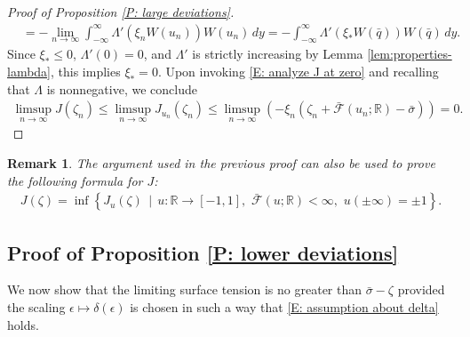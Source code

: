 \documentclass[10pt,a4paper]{amsart}
\newtheorem{remark}{Remark}
\begin{document}
\begin{proof}[Proof of Proposition \ref{P: large deviations}]
\begin{align*}
		&= - \lim_{ n \to \infty } \int_{-\infty}^{\infty} \Lambda'(\xi_{n} W(u_{n}) ) W(u_{n}) \, dy = - \int_{-\infty}^{\infty} \Lambda'(\xi_{*} W(\bar{q}) ) W(\bar{q}) \, dy.
	\end{align*}
Since $\xi_{*} \leq 0$, $\Lambda'(0) = 0$, and $\Lambda'$ is strictly increasing by Lemma \ref{lem:properties-lambda}, this implies $\xi_{*} = 0$.  Upon invoking \eqref{E: analyze J at zero} and recalling that $\Lambda$ is nonnegative, we conclude
	\begin{align*}
		\limsup_{n \to \infty} J(\zeta_{n}) \leq \limsup_{n \to \infty} J_{u_{n}}(\zeta_{n}) \leq \limsup_{n \to \infty} \left( - \xi_{n} ( \zeta_{n} + \bar{\mathscr{F}}(u_{n};\mathbb{R}) - \bar{\sigma} ) \right) = 0.
	\end{align*}
       \end{proof}  

\begin{remark} The argument used in the previous proof can also be used to prove the following formula for $J$:
	\begin{align*}
		J(\zeta) = \inf \left\{ J_{u}(\zeta) \, \mid \, u : \mathbb{R} \to [-1,1], \, \, \bar{\mathscr{F}}(u;\mathbb{R}) < \infty, \, \, u(\pm \infty) = \pm 1 \right\}.
	\end{align*}\end{remark}
        
\subsection{Proof of Proposition \ref{P: lower deviations}} We now show that the limiting surface tension is no greater than $\bar{\sigma} - \zeta$ provided the scaling $\epsilon \mapsto \delta(\epsilon)$ is chosen in such a way that \eqref{E: assumption about delta} holds. 
	
\end{document}
